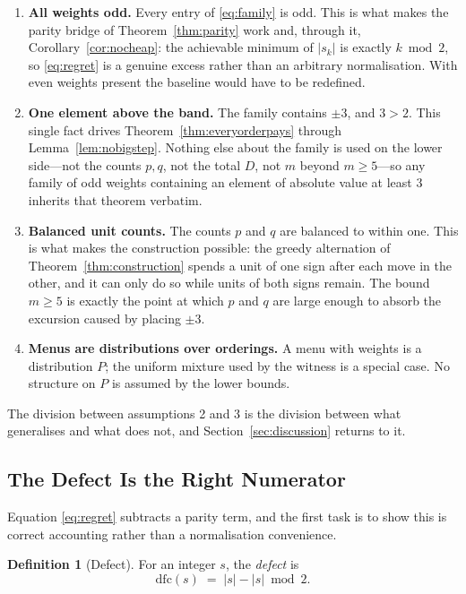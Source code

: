 \documentclass[conference]{IEEEtran}
\theoremstyle{definition}
\newtheorem{definition}[theorem]{Definition}
\begin{document}
\begin{enumerate}
\item[1)] \textbf{All weights odd.} Every entry of \eqref{eq:family} is odd. This is what
makes the parity bridge of Theorem~\ref{thm:parity} work and, through it,
Corollary~\ref{cor:nocheap}: the achievable minimum of $|s_{k}|$ is exactly $k\bmod2$, so
\eqref{eq:regret} is a genuine excess rather than an arbitrary normalisation. With even
weights present the baseline would have to be redefined.

\item[2)] \textbf{One element above the band.} The family contains $\pm3$, and $3>2$. This
single fact drives Theorem~\ref{thm:everyorderpays} through
Lemma~\ref{lem:nobigstep}. Nothing else about the family is used on the lower side---not the
counts $p,q$, not the total $D$, not $m$ beyond $m\ge5$---so any family of odd weights
containing an element of absolute value at least $3$ inherits that theorem verbatim.

\item[3)] \textbf{Balanced unit counts.} The counts $p$ and $q$ are balanced to within one.
This is what makes the construction possible: the greedy alternation of
Theorem~\ref{thm:construction} spends a unit of one sign after each move in the other, and it
can only do so while units of both signs remain. The bound $m\ge5$ is exactly the point at
which $p$ and $q$ are large enough to absorb the excursion caused by placing $\pm3$.

\item[4)] \textbf{Menus are distributions over orderings.} A menu with weights is a
distribution $P$; the uniform mixture used by the witness is a special case. No structure on
$P$ is assumed by the lower bounds.
\end{enumerate}

The division between assumptions 2 and 3 is the division between what generalises and what
does not, and Section~\ref{sec:discussion} returns to it.

\subsection{The Defect Is the Right Numerator}
\label{sec:defect}

Equation \eqref{eq:regret} subtracts a parity term, and the first task is to show this is
correct accounting rather than a normalisation convenience.

\begin{definition}[Defect]
For an integer $s$, the \emph{defect} is
\begin{equation}
\mathrm{dfc}(s)\;=\;|s|-|s|\bmod 2 .
\label{eq:dfc}
\end{equation}
\end{definition}
\end{document}
